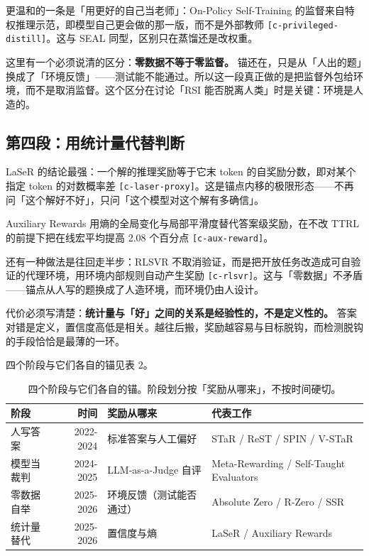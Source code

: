 更温和的一条是「用更好的自己当老师」：On-Policy Self-Training 的监督来自特权推理示范，即模型自己更会做的那一版，而不是外部教师 {\scriptsize\texttt{[c-\hspace{0pt}privileged-\hspace{0pt}distill]}}。这与 SEAL 同型，区别只在蒸馏还是改权重。


这里有一个必须说清的区分：\textbf{零数据不等于零监督。} 锚还在，只是从「人出的题」换成了「环境反馈」——测试能不能通过。所以这一段真正做的是把监督外包给环境，而不是取消监督。这个区分在讨论「RSI 能否脱离人类」时是关键：环境是人造的。


\subsection{第四段：用统计量代替判断}

LaSeR 的结论最强：一个解的推理奖励等于它末 token 的自奖励分数，即对某个指定 token 的对数概率差 {\scriptsize\texttt{[c-\hspace{0pt}laser-\hspace{0pt}proxy]}}。这是锚点内移的极限形态——不再问「这个解好不好」，只问「这个模型对这个解有多确信」。


Auxiliary Rewards 用熵的全局变化与局部平滑度替代答案级奖励，在不改 TTRL 的前提下把在线宏平均提高 2.08 个百分点 {\scriptsize\texttt{[c-\hspace{0pt}aux-\hspace{0pt}reward]}}。


还有一种做法是往回走半步：RLSVR 不取消验证，而是把开放任务改造成可自验证的代理环境，用环境内部规则自动产生奖励 {\scriptsize\texttt{[c-\hspace{0pt}rlsvr]}}。这与「零数据」不矛盾——锚点从人写的题换成了人造环境，而环境仍由人设计。


代价必须写清楚：\textbf{统计量与「好」之间的关系是经验性的，不是定义性的。} 答案对错是定义，置信度高低是相关。越往后搬，奖励越容易与目标脱钩，而检测脱钩的手段恰恰是最薄的一环。


四个阶段与它们各自的锚见表 2。


\begin{table}[t]
\centering
\footnotesize
\setlength{\tabcolsep}{4pt}
\caption{四个阶段与它们各自的锚。阶段划分按「奖励从哪来」，不按时间硬切。}
\label{tab:2}
\begin{tabularx}{\textwidth}{lrlX}
\toprule
阶段 & 时间 & 奖励从哪来 & 代表工作 \\
\midrule
人写答案 & 2022-2024 & 标准答案与人工偏好 & STaR / ReST / SPIN / V-STaR \\
模型当裁判 & 2024-2025 & LLM-as-a-Judge 自评 & Meta-Rewarding / Self-Taught Evaluators \\
零数据自举 & 2025-2026 & 环境反馈（测试能否通过） & Absolute Zero / R-Zero / SSR \\
统计量替代 & 2025-2026 & 置信度与熵 & LaSeR / Auxiliary Rewards \\
\bottomrule
\end{tabularx}
\end{table}

